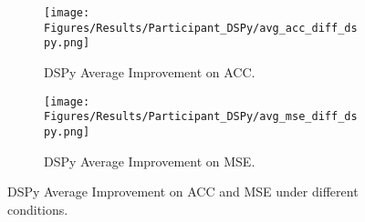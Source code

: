 \begin{figure}
    \centering
    \begin{subfigure}{0.85\textwidth}
    \texttt{[image: Figures/Results/Participant\_DSPy/avg\_acc\_diff\_dspy.png]}
    \caption{DSPy Average Improvement on ACC.}
    \label{fig:avg-acc-dspy-improvement}
  \end{subfigure}
  \hfill
  \begin{subfigure}{0.85\textwidth}
    \texttt{[image: Figures/Results/Participant\_DSPy/avg\_mse\_diff\_dspy.png]}
    \caption{DSPy Average Improvement on MSE.}
    \label{fig:avg-mse-dspy-improvement}
  \end{subfigure}
  \caption{DSPy Average Improvement on ACC and MSE under different conditions.}
  \label{fig:average-acc-mse-dspy-improvement}
\end{figure}




